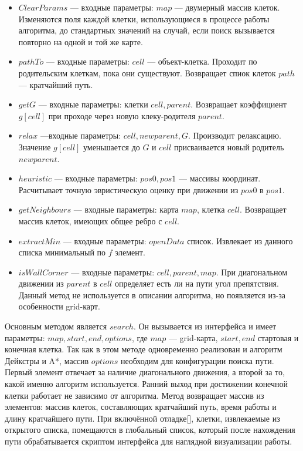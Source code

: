 \begin{itemize}
\item $ClearParams$ — входные параметры: $map$ — двумерный массив клеток. Изменяются поля каждой клетки, использующиеся в процессе работы алгоритма, до стандартных значений на случай, если поиск вызывается повторно на одной и той же карте.
\item $pathTo$ — входные параметры: $cell$ — объект-клетка. Проходит по родительским клеткам, пока они существуют. Возвращает спиок клеток $path$ — кратчайший путь.
\item $getG$ — входные параметры: клетки $cell,parent$. Возвращает коэффициент $g[cell]$ при проходе через новую клеку-родителя $parent$.
\item $relax$ —входные параметры: $cell, newparent, G$. Производит релаксацию. Значение $g[cell]$ уменьшается до $G$ и $cell$ присваивается новый родитель\\$newparent$.
\item $heuristic$ — входные параметры: $pos0, pos1$ — массивы координат. Расчитывает точную эвристическую оценку при движении из $pos0$ в $pos1$.
\item $getNeighbours$ — входные параметры: карта $map$, клетка $cell$. Возвращает массив клеток, имеющих общее ребро с $cell$.
\item $extractMin$ — входные параметры: $openData$ список. Извлекает из данного списка минимальный по $f$ элемент.
\item $isWallCorner$ — входные параметры: $cell,parent,map$. При диагональном движении из $parent$ в $cell$ определяет есть ли на пути угол препятствия. Данный метод не используется в описании алгоритма, но появляется из-за особенности grid-карт.
\end{itemize}

Основным методом является $search$. Он вызывается из интерфейса и имеет параметры: $map, start, end, options$, где $map$ — grid-карта, $start, end$ стартовая и конечная клетка. Так как в этом методе одновременно реализован и алгоритм Дейкстры и A*, массив $options$ необходим для конфигурации поиска пути. Первый элемент отвечает за наличие диагонального движения, а второй за то, какой именно алгоритм используется. Ранний выход при достижении конечной клетки работает не зависимо от алгоритма. Метод возвращает массив из элементов: массив клеток, составляющих кратчайший путь, время работы и длину кратчайшего пути. При включённой отладке[], клетки, извлекаемые из открытого списка, помещаются в глобальный список, который после нахождения пути обрабатывается скриптом интерфейса для наглядной визуализации работы.

